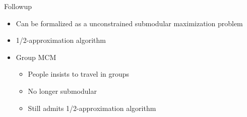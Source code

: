 \begin{frame}[<+->]{Followup}
\begin{itemize}
	\item Can be formalized as a unconstrained submodular maximization problem
	\item 1/2-approximation algorithm
	\item Group MCM
  	\begin{itemize}
    	\item People insists to travel in groups
    	\item No longer submodular
    	\item Still admits 1/2-approximation algorithm 
	\end{itemize}   
\end{itemize}
\end{frame}
